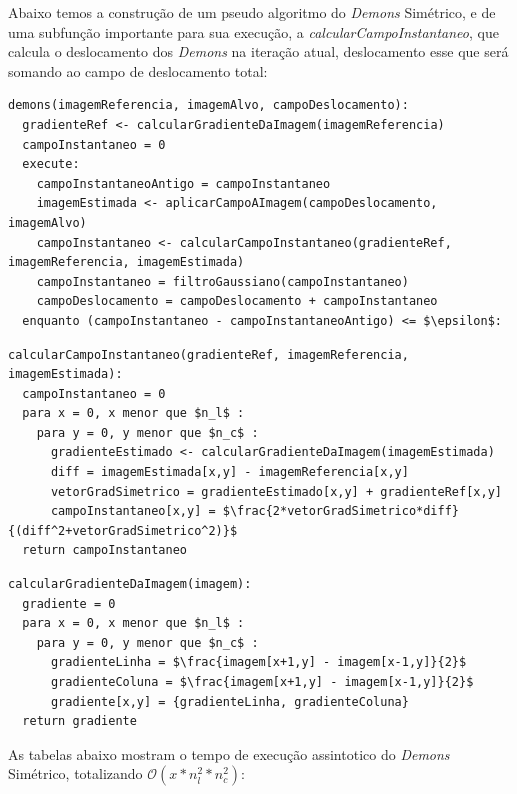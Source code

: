   Abaixo temos a construção de um pseudo algoritmo do \textit{Demons} Simétrico, e de uma subfunção importante para sua 
execução, a \textit{calcularCampoInstantaneo}, que calcula o deslocamento dos \textit{Demons} na iteração atual, 
deslocamento esse que será somando ao campo de deslocamento total:

\begin{lstlisting}[mathescape]
demons(imagemReferencia, imagemAlvo, campoDeslocamento):
  gradienteRef <- calcularGradienteDaImagem(imagemReferencia)
  campoInstantaneo = 0
  execute:
    campoInstantaneoAntigo = campoInstantaneo
    imagemEstimada <- aplicarCampoAImagem(campoDeslocamento, imagemAlvo)
    campoInstantaneo <- calcularCampoInstantaneo(gradienteRef, imagemReferencia, imagemEstimada)
    campoInstantaneo = filtroGaussiano(campoInstantaneo)
    campoDeslocamento = campoDeslocamento + campoInstantaneo
  enquanto (campoInstantaneo - campoInstantaneoAntigo) <= $\epsilon$:
\end{lstlisting}

\begin{lstlisting}[mathescape]
calcularCampoInstantaneo(gradienteRef, imagemReferencia, imagemEstimada):
  campoInstantaneo = 0
  para x = 0, x menor que $n_l$ :
    para y = 0, y menor que $n_c$ :
      gradienteEstimado <- calcularGradienteDaImagem(imagemEstimada)
      diff = imagemEstimada[x,y] - imagemReferencia[x,y]
      vetorGradSimetrico = gradienteEstimado[x,y] + gradienteRef[x,y]
      campoInstantaneo[x,y] = $\frac{2*vetorGradSimetrico*diff}{(diff^2+vetorGradSimetrico^2)}$
  return campoInstantaneo
\end{lstlisting}

\begin{lstlisting}[mathescape]
calcularGradienteDaImagem(imagem):
  gradiente = 0
  para x = 0, x menor que $n_l$ :
    para y = 0, y menor que $n_c$ :
      gradienteLinha = $\frac{imagem[x+1,y] - imagem[x-1,y]}{2}$
      gradienteColuna = $\frac{imagem[x+1,y] - imagem[x-1,y]}{2}$
      gradiente[x,y] = {gradienteLinha, gradienteColuna}
  return gradiente
\end{lstlisting}

  As tabelas abaixo mostram o tempo de execução assintotico do \textit{Demons} Simétrico, totalizando 
$\mathcal{O}(x*n_l^2*n_c^2)$:

